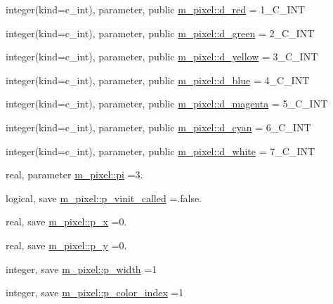 \begin{DoxyCompactItemize}
\item 
integer(kind=c\+\_\+int), parameter, public \mbox{\hyperlink{namespacem__pixel_a79a9da737aa4362052e625bf692e4426}{m\+\_\+pixel\+::d\+\_\+red}} = 1\+\_\+\+C\+\_\+\+I\+NT
\item 
integer(kind=c\+\_\+int), parameter, public \mbox{\hyperlink{namespacem__pixel_a7826b243f01d8a4b6a8376a71ff0aab0}{m\+\_\+pixel\+::d\+\_\+green}} = 2\+\_\+\+C\+\_\+\+I\+NT
\item 
integer(kind=c\+\_\+int), parameter, public \mbox{\hyperlink{namespacem__pixel_ac67e6b5e1f5dfb58a70f4f63fd92a5b7}{m\+\_\+pixel\+::d\+\_\+yellow}} = 3\+\_\+\+C\+\_\+\+I\+NT
\item 
integer(kind=c\+\_\+int), parameter, public \mbox{\hyperlink{namespacem__pixel_af2a1f35244e511380fe83cc31ceb31a8}{m\+\_\+pixel\+::d\+\_\+blue}} = 4\+\_\+\+C\+\_\+\+I\+NT
\item 
integer(kind=c\+\_\+int), parameter, public \mbox{\hyperlink{namespacem__pixel_a499c4e58df4136e662c8e15de6ba0b3b}{m\+\_\+pixel\+::d\+\_\+magenta}} = 5\+\_\+\+C\+\_\+\+I\+NT
\item 
integer(kind=c\+\_\+int), parameter, public \mbox{\hyperlink{namespacem__pixel_ae515f0991ef77d85371b85c6fdb2a67f}{m\+\_\+pixel\+::d\+\_\+cyan}} = 6\+\_\+\+C\+\_\+\+I\+NT
\item 
integer(kind=c\+\_\+int), parameter, public \mbox{\hyperlink{namespacem__pixel_accffd1d4aa8ce679a6049855ea7ab29c}{m\+\_\+pixel\+::d\+\_\+white}} = 7\+\_\+\+C\+\_\+\+I\+NT
\item 
real, parameter \mbox{\hyperlink{namespacem__pixel_a2ff737e84d07f927bac2deb1801428a2}{m\+\_\+pixel\+::pi}} =3.
\item 
logical, save \mbox{\hyperlink{namespacem__pixel_a5205a23825feacbc005215adc889a710}{m\+\_\+pixel\+::p\+\_\+vinit\+\_\+called}} =.false.
\item 
real, save \mbox{\hyperlink{namespacem__pixel_a983dc4bc4ea45266ee8b5100367bedee}{m\+\_\+pixel\+::p\+\_\+x}} =0.
\item 
real, save \mbox{\hyperlink{namespacem__pixel_a8bda60db9b6c7c2402e1e12a44bc36aa}{m\+\_\+pixel\+::p\+\_\+y}} =0.
\item 
integer, save \mbox{\hyperlink{namespacem__pixel_a0ccc9f9102afdf3b469b3d2cab22aec9}{m\+\_\+pixel\+::p\+\_\+width}} =1
\item 
integer, save \mbox{\hyperlink{namespacem__pixel_af37b7b3481f3876270e99200e2554b9f}{m\+\_\+pixel\+::p\+\_\+color\+\_\+index}} =1
\item 

\end{DoxyCompactItemize}
